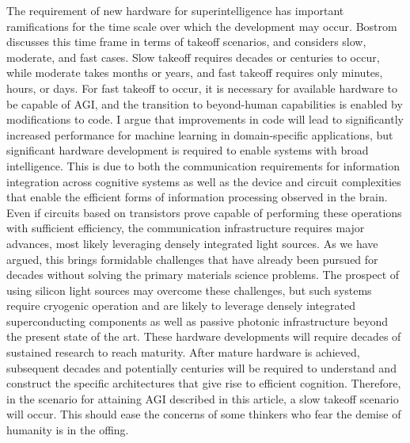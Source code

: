 The requirement of new hardware for superintelligence has important ramifications for the time scale over which the development may occur. Bostrom discusses this time frame in terms of takeoff scenarios, and considers slow, moderate, and fast cases. Slow takeoff requires decades or centuries to occur, while moderate takes months or years, and fast takeoff requires only minutes, hours, or days. For fast takeoff to occur, it is necessary for available hardware to be capable of AGI, and the transition to beyond-human capabilities is enabled by modifications to code. I argue that improvements in code will lead to significantly increased performance for machine learning in domain-specific applications, but significant hardware development is required to enable systems with broad intelligence. This is due to both the communication requirements for information integration across cognitive systems as well as the device and circuit complexities that enable the efficient forms of information processing observed in the brain. Even if circuits based on transistors prove capable of performing these operations with sufficient efficiency, the communication infrastructure requires major advances, most likely leveraging densely integrated light sources. As we have argued, this brings formidable challenges that have already been pursued for decades without solving the primary materials science problems. The prospect of using silicon light sources may overcome these challenges, but such systems require cryogenic operation and are likely to leverage densely integrated superconducting components as well as passive photonic infrastructure beyond the present state of the art. These hardware developments will require decades of sustained research to reach maturity. After mature hardware is achieved, subsequent decades and potentially centuries will be required to understand and construct the specific architectures that give rise to efficient cognition. Therefore, in the scenario for attaining AGI described in this article, a slow takeoff scenario will occur. This should ease the concerns of some thinkers who fear the demise of humanity is in the offing.

